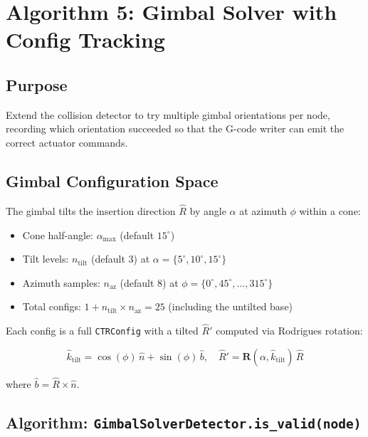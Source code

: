 \documentclass[11pt,a4paper]{article}
\newcommand{\funcname}[1]{\texttt{\textcolor{codepurple}{#1}}}
\begin{document}
\section{Algorithm 5: Gimbal Solver with Config Tracking}
\label{sec:gimbal}

\subsection{Purpose}

Extend the collision detector to try multiple gimbal orientations per node, recording which orientation succeeded so that the G-code writer can emit the correct actuator commands.

\subsection{Gimbal Configuration Space}

The gimbal tilts the insertion direction $\hat{R}$ by angle $\alpha$ at azimuth $\phi$ within a cone:

\begin{itemize}[nosep]
    \item Cone half-angle: $\alpha_\text{max}$ (default $15^\circ$)
    \item Tilt levels: $n_\text{tilt}$ (default 3) at $\alpha = \{5^\circ, 10^\circ, 15^\circ\}$
    \item Azimuth samples: $n_\text{az}$ (default 8) at $\phi = \{0^\circ, 45^\circ, \ldots, 315^\circ\}$
    \item Total configs: $1 + n_\text{tilt} \times n_\text{az} = 25$ (including the untilted base)
\end{itemize}

Each config is a full \texttt{CTRConfig} with a tilted $\hat{R}'$ computed via Rodrigues rotation:

\[
\hat{k}_\text{tilt} = \cos(\phi)\,\hat{n} + \sin(\phi)\,\hat{b}, \quad
\hat{R}' = \mathbf{R}(\alpha, \hat{k}_\text{tilt})\,\hat{R}
\]

where $\hat{b} = \hat{R} \times \hat{n}$.

\subsection{Algorithm: \funcname{GimbalSolverDetector.is\_valid(node)}}
\end{document}
